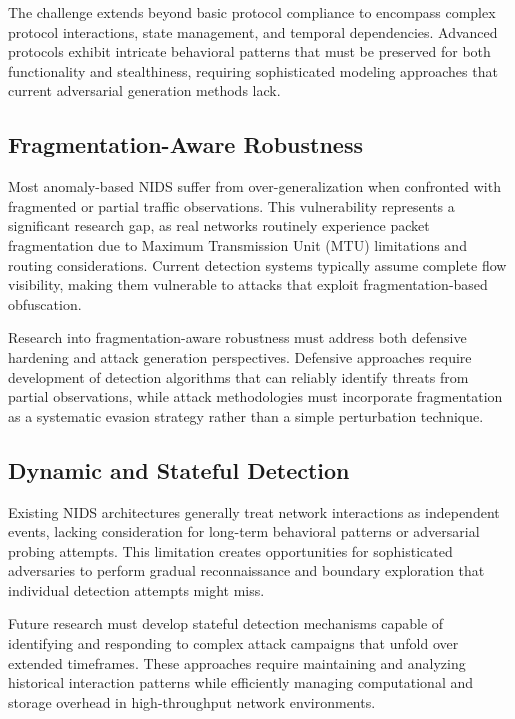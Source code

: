 The challenge extends beyond basic protocol compliance to encompass complex protocol interactions, state management, and temporal dependencies. Advanced protocols exhibit intricate behavioral patterns that must be preserved for both functionality and stealthiness, requiring sophisticated modeling approaches that current adversarial generation methods lack.

\subsection{Fragmentation-Aware Robustness}

Most anomaly-based NIDS suffer from over-generalization when confronted with fragmented or partial traffic observations. This vulnerability represents a significant research gap, as real networks routinely experience packet fragmentation due to Maximum Transmission Unit (MTU) limitations and routing considerations. Current detection systems typically assume complete flow visibility, making them vulnerable to attacks that exploit fragmentation-based obfuscation.

Research into fragmentation-aware robustness must address both defensive hardening and attack generation perspectives. Defensive approaches require development of detection algorithms that can reliably identify threats from partial observations, while attack methodologies must incorporate fragmentation as a systematic evasion strategy rather than a simple perturbation technique.

\subsection{Dynamic and Stateful Detection}

Existing NIDS architectures generally treat network interactions as independent events, lacking consideration for long-term behavioral patterns or adversarial probing attempts. This limitation creates opportunities for sophisticated adversaries to perform gradual reconnaissance and boundary exploration that individual detection attempts might miss.

Future research must develop stateful detection mechanisms capable of identifying and responding to complex attack campaigns that unfold over extended timeframes. These approaches require maintaining and analyzing historical interaction patterns while efficiently managing computational and storage overhead in high-throughput network environments.

